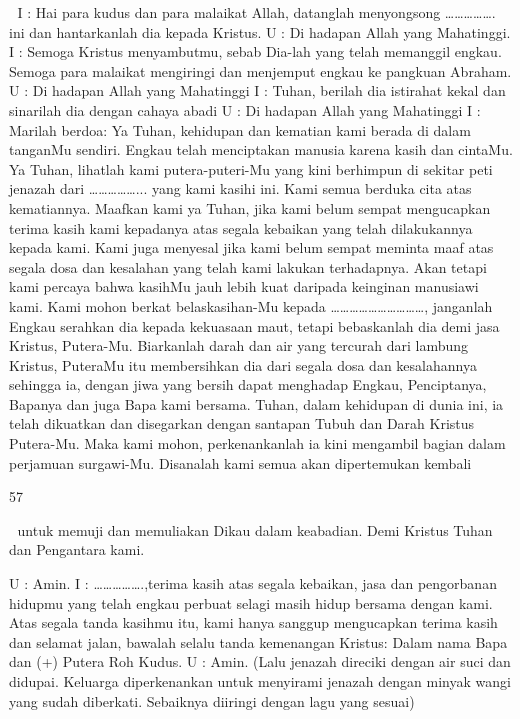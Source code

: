 \documentclass[10pt,a5paper,fancyhdr]{memoir}
\begin{document}

I : Hai para kudus dan para malaikat Allah, datanglah menyongsong 
……………. ini dan hantarkanlah dia kepada Kristus. 
U : Di hadapan Allah yang Mahatinggi. 
I : Semoga Kristus menyambutmu, sebab Dia-lah yang telah 
memanggil engkau. Semoga para malaikat mengiringi dan 
menjemput engkau ke pangkuan Abraham. 
U : Di hadapan Allah yang Mahatinggi 
I : Tuhan, berilah dia istirahat kekal dan sinarilah dia dengan cahaya 
abadi 
U : Di hadapan Allah yang Mahatinggi 
I : Marilah berdoa: 
Ya Tuhan, kehidupan dan kematian kami berada di dalam tanganMu 
sendiri. Engkau telah menciptakan manusia karena kasih dan 
cintaMu. Ya Tuhan, lihatlah kami putera-puteri-Mu yang kini 
berhimpun di sekitar peti jenazah dari ……………... yang kami 
kasihi ini. Kami semua berduka cita atas kematiannya. Maafkan kami 
ya Tuhan, jika kami belum sempat mengucapkan terima kasih kami 
kepadanya atas segala kebaikan yang telah dilakukannya kepada 
kami. Kami juga menyesal jika kami belum sempat meminta maaf 
atas segala dosa dan kesalahan yang telah kami lakukan terhadapnya. 
Akan tetapi kami percaya bahwa kasihMu jauh lebih kuat daripada 
keinginan manusiawi kami. Kami mohon berkat belaskasihan-Mu 
kepada …………………………, janganlah Engkau serahkan dia 
kepada kekuasaan maut, tetapi bebaskanlah dia demi jasa Kristus, 
Putera-Mu. Biarkanlah darah dan air yang tercurah dari lambung 
Kristus, PuteraMu itu membersihkan dia dari segala dosa dan 
kesalahannya sehingga ia, dengan jiwa yang bersih dapat menghadap 
Engkau, Penciptanya, Bapanya dan juga Bapa kami bersama. Tuhan, 
dalam kehidupan di dunia ini, ia telah dikuatkan dan disegarkan 
dengan santapan Tubuh dan Darah Kristus Putera-Mu. Maka kami 
mohon, perkenankanlah ia kini mengambil bagian dalam perjamuan 
surgawi-Mu. Disanalah kami semua akan dipertemukan kembali 

57 



untuk memuji dan memuliakan Dikau dalam keabadian. Demi 
Kristus Tuhan dan Pengantara kami. 

U : Amin. 
I : …………….,terima kasih atas segala kebaikan, jasa dan 
pengorbanan hidupmu yang telah engkau perbuat selagi masih hidup 
bersama dengan kami. Atas segala tanda kasihmu itu, kami hanya 
sanggup mengucapkan terima kasih dan selamat jalan, bawalah selalu 
tanda kemenangan Kristus: Dalam nama Bapa dan (+) Putera Roh 
Kudus. 
U : Amin. 
(Lalu jenazah direciki dengan air suci dan didupai. Keluarga 
diperkenankan untuk menyirami jenazah dengan minyak wangi yang 
sudah diberkati. Sebaiknya diiringi dengan lagu yang sesuai) 
\end{document}
